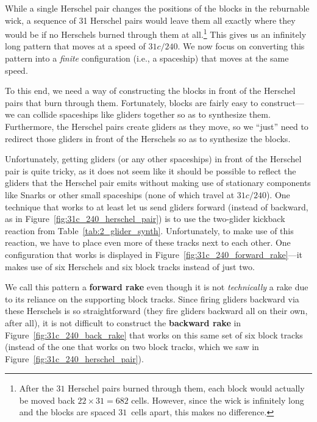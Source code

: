 While a single Herschel pair changes the positions of the blocks in the reburnable wick, a sequence of 31 Herschel pairs would leave them all exactly where they would be if no Herschels burned through them at all.\footnote{After the $31$ Herschel pairs burned through them, each block would actually be moved back $22 \times 31 = 682$ cells. However, since the wick is infinitely long and the blocks are spaced $31$~cells apart, this makes no difference.} This gives us an infinitely long pattern that moves at a speed of $31c/240$. We now focus on converting this pattern into a \emph{finite} configuration (i.e., a spaceship) that moves at the same speed.

To this end, we need a way of constructing the blocks in front of the Herschel pairs that burn through them. Fortunately, blocks are fairly easy to construct---we can collide spaceships like gliders together so as to synthesize them. Furthermore, the Herschel pairs create gliders as they move, so we ``just'' need to redirect those gliders in front of the Herschels so as to synthesize the blocks.

Unfortunately, getting gliders (or any other spaceships) in front of the Herschel pair is quite tricky, as it does not seem like it should be possible to reflect the gliders that the Herschel pair emits without making use of stationary components like Snarks or other small spaceships (none of which travel at $31c/240$). One technique that works to at least let us send gliders forward (instead of backward, as in Figure~\ref{fig:31c_240_herschel_pair}) is to use the two-glider kickback reaction from Table~\ref{tab:2_glider_synth}. Unfortunately, to make use of this reaction, we have to place even more of these tracks next to each other. One configuration that works is displayed in Figure~\ref{fig:31c_240_forward_rake}---it makes use of six Herschels and six block tracks instead of just two.

We call this pattern a \textbf{forward rake} even though it is not \emph{technically} a rake due to its reliance on the supporting block tracks. Since firing gliders backward via these Herschels is so straightforward (they fire gliders backward all on their own, after all), it is not difficult to construct the \textbf{backward rake} in Figure~\ref{fig:31c_240_back_rake} that works on this same set of six block tracks (instead of the one that works on two block tracks, which we saw in Figure~\ref{fig:31c_240_herschel_pair}).

